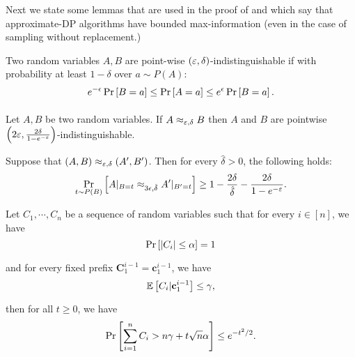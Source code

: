 Next we state some lemmas that are used in the proof of  and  which say that approximate-DP algorithms have bounded max-information (even in the case of sampling without replacement.)

\begin{definition}
Two random variables $A,B$ are point-wise $(\varepsilon, \delta)$-indistinguishable if with probability at least $1-\delta$ over $ a \sim P(A)$:
$$
e^{-\epsilon} \operatorname*{\mathrm{Pr}}_{}\left[B = a\right] \leq \operatorname*{\mathrm{Pr}}_{}\left[A = a\right] \leq e^{\epsilon} \operatorname*{\mathrm{Pr}}_{}\left[B=a\right].
$$
\end{definition}

\begin{lemma} \label{lem:prelims}
 Let $A, B$ be two random variables. If $A \approx_{\varepsilon, \delta} B$ then $A$ and $B$ are pointwise $\left(2\varepsilon, \frac{2\delta}{1-e^{-\varepsilon}} \right) $-indistinguishable.
\end{lemma}

\begin{lemma}\label{lem:conditioning}
Suppose that $(A,B) \approx_{\varepsilon, \delta} (A',B')$.  Then for every $\hat \delta>0$, the following holds:
$$
\operatorname*{\mathrm{Pr}}_{t \sim P(B) }\left[ A|_{B = t} \approx_{3\epsilon, \hat\delta} A'|_{B'=t} \right] \geq 1-\frac{2\delta}{\hat\delta} - \frac{2\delta}{1-e^{-\varepsilon}}.
$$
\end{lemma}

\begin{theorem}
Let $C_1, \cdots, C_n$ be a sequence of random variables such that for every $i \in [n]$, we have
$$
\operatorname*{\mathrm{Pr}}_{}\left[|C_i| \leq \alpha\right] = 1
$$
and for every fixed prefix $\mathbf{C}_1^{i-1} = \mathbf{c}_1^{i-1}$, we have
$$
\operatorname*{\mathbb{E}}_{}\left[C_i|\mathbf{c}_1^{i-1}\right] \leq \gamma,
$$
then for all $t\geq 0$, we have
$$
\operatorname*{\mathrm{Pr}}_{}\left[\sum_{i=1}^n C_i > n \gamma + t \sqrt{n} \alpha\right] \leq e^{-t^2/2}.
$$
\label{thm:azuma}
\end{theorem}


